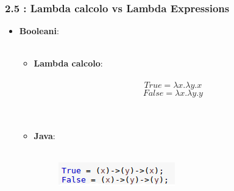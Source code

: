 \documentclass{beamer}
\begin{document}

\begin{frame}
	\frametitle{\textbf{2.5 : Lambda calcolo vs Lambda Expressions}}
	\begin{itemize}
		\item
			\textbf{Booleani}:\\\
			\begin{itemize}
				\item 
					\textbf{Lambda calcolo}:\\\
						\[
							True = \lambda x.\lambda y.x
						\]
						\[
							False = \lambda x.\lambda y.y
						\]\\\
				\item 
					\textbf{Java}:\\\
					\begin{figure}
						\centering
						\includegraphics[width=0.4\linewidth]{image/booleani.png}
						\label{fig:identity}
					\end{figure}
			\end{itemize}	
	\end{itemize}
\end{frame}

\end{document}
